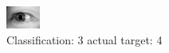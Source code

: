 \begin{figure}[h!]
\begin{center}
\includegraphics[width=0.60\columnwidth]{figures/ID3151_class_3_target_4.png}
\end{center}
\caption{ Classification: 3 actual target: 4}
\label{fig:ID3151_class_3_target_4}
\end{figure}
